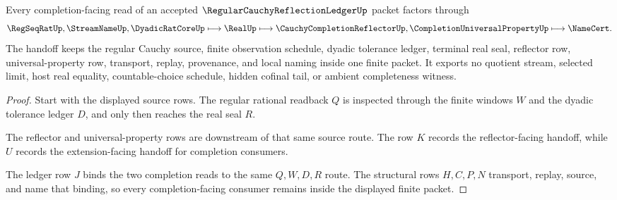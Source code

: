 \begin{theorem}
\label{thm:cauchy-completion-reflection-ledger-universal-handoff}
Every completion-facing read of an accepted $\RegularCauchyReflectionLedgerUp$ packet factors through
$$
\RegSeqRatUp,\StreamNameUp,\DyadicRatCoreUp \longmapsto \RealUp \longmapsto \CauchyCompletionReflectorUp,\CompletionUniversalPropertyUp \longmapsto \NameCert .
$$
The handoff keeps the regular Cauchy source, finite observation schedule, dyadic tolerance ledger, terminal real seal, reflector row, universal-property row, transport, replay, provenance, and local naming inside one finite packet. It exports no quotient stream, selected limit, host real equality, countable-choice schedule, hidden cofinal tail, or ambient completeness witness.
\end{theorem}
\begin{proof}
Start with the displayed source rows. The regular rational readback $Q$ is inspected through the finite windows $W$ and the dyadic tolerance ledger $D$, and only then reaches the real seal $R$.

The reflector and universal-property rows are downstream of that same source route. The row $K$ records the reflector-facing handoff, while $U$ records the extension-facing handoff for completion consumers.

The ledger row $J$ binds the two completion reads to the same $Q,W,D,R$ route. The structural rows $H,C,P,N$ transport, replay, source, and name that binding, so every completion-facing consumer remains inside the displayed finite packet.
\end{proof}



